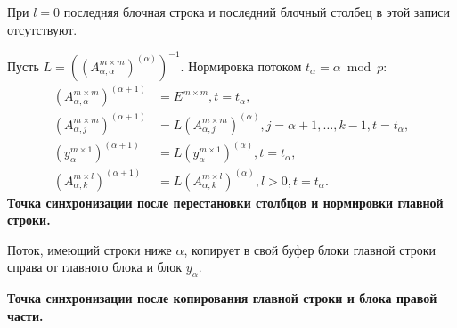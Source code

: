 \documentclass[a4paper,12pt]{article}
\newcommand{\br}[1]{\left(#1\right)}
\begin{document}
При $l = 0$ последняя блочная строка и последний блочный столбец в этой записи отсутствуют.

Пусть $L = \br{\br{A_{\alpha, \alpha}^{m \times m}}^{(\alpha)}}^{-1}$. Нормировка потоком $t_\alpha = \alpha \bmod p$:
\begin{align*}
    \br{A_{\alpha, \alpha}^{m \times m}}^{(\alpha + 1)} & = E^{m \times m},
        t = t_\alpha, \\
    \br{A_{\alpha, j}^{m \times m}}^{(\alpha + 1)} & = L \br{A_{\alpha, j}^{m \times m}}^{(\alpha)},
        j = \alpha + 1, \dots, k - 1,t = t_\alpha, \\
    \br{y_{\alpha}^{m \times 1}}^{(\alpha + 1)} & = L \br{y_{\alpha}^{m \times 1}}^{(\alpha)},
        t = t_\alpha, \\
    \br{A_{\alpha, k}^{m \times l}}^{(\alpha + 1)} & = L \br{A_{\alpha, k}^{m \times l}}^{(\alpha)},
        l > 0,t = t_\alpha.
\end{align*}
\textbf{Точка синхронизации после перестановки столбцов и нормировки главной строки.}

Поток, имеющий строки ниже $\alpha$, копирует в свой буфер блоки главной строки справа от главного блока и блок $y_\alpha$.

\textbf{Точка синхронизации после копирования главной строки и блока правой части.}
\end{document}
